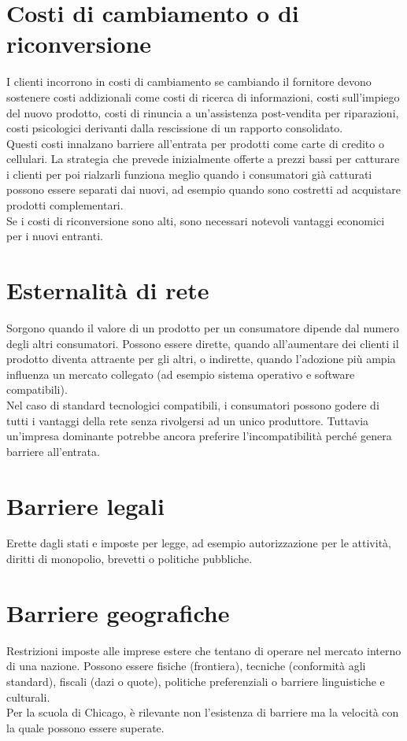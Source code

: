 \documentclass{report}
\begin{document}
	\section{Costi di cambiamento o di riconversione}
	I clienti incorrono in costi di cambiamento se cambiando il fornitore devono sostenere costi addizionali come costi di ricerca di informazioni, costi sull'impiego del nuovo prodotto, costi di rinuncia a un'assistenza post-vendita per riparazioni, costi psicologici derivanti dalla rescissione di un rapporto consolidato.
	\medskip \\
	Questi costi innalzano barriere all'entrata per prodotti come carte di credito o cellulari. La strategia che prevede inizialmente offerte a prezzi bassi per catturare i clienti per poi rialzarli funziona meglio quando i consumatori già catturati possono essere separati dai nuovi, ad esempio quando sono costretti ad acquistare prodotti complementari.
	\medskip \\
	Se i costi di riconversione sono alti, sono necessari notevoli vantaggi economici per i nuovi entranti.
	\section{Esternalità di rete}
	Sorgono quando il valore di un prodotto per un consumatore dipende dal numero degli altri consumatori. Possono essere dirette, quando all'aumentare dei clienti il prodotto diventa attraente per gli altri, o indirette, quando l'adozione più ampia influenza un mercato collegato (ad esempio sistema operativo e software compatibili).
	\medskip \\
	Nel caso di standard tecnologici compatibili, i consumatori possono godere di tutti i vantaggi della rete senza rivolgersi ad un unico produttore. Tuttavia un'impresa dominante potrebbe ancora preferire l'incompatibilità perché genera barriere all'entrata.
	\section{Barriere legali}
	Erette dagli stati e imposte per legge, ad esempio autorizzazione per le attività, diritti di monopolio, brevetti o politiche pubbliche.
	\section{Barriere geografiche}
	Restrizioni imposte alle imprese estere che tentano di operare nel mercato interno di una nazione. Possono essere fisiche (frontiera), tecniche (conformità agli standard), fiscali (dazi o quote), politiche preferenziali o barriere linguistiche e culturali.
	\medskip \\Per la scuola di Chicago, è rilevante non l'esistenza di barriere ma la velocità con la quale possono essere superate.
\end{document}
